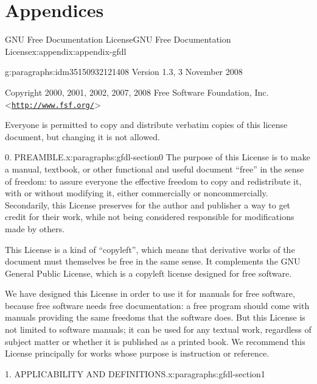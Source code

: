 \documentclass[twoside,10pt,]{tufte-book}
\numberwithin{equation}{part}
\begin{document}
\part*{Appendices}%
%
%
\typeout{************************************************}
\typeout{************************************************}
%
\begin{appendixptx}{GNU Free Documentation License}{}{GNU Free Documentation License}{}{}{x:appendix:appendix-gfdl}
\begin{paragraphs}{}{g:paragraphs:idm35150932121408}%
Version 1.3, 3 November 2008%
\par
Copyright \textcopyright{} 2000, 2001, 2002, 2007, 2008 Free Software Foundation, Inc. \textless{}\href{http://www.fsf.org/}{\nolinkurl{http://www.fsf.org/}}\textgreater{}%
\par
Everyone is permitted to copy and distribute verbatim copies of this license document, but changing it is not allowed.%
\end{paragraphs}%
\begin{paragraphs}{0. PREAMBLE.}{x:paragraphs:gfdl-section0}%
The purpose of this License is to make a manual, textbook, or other functional and useful document ``free'' in the sense of freedom: to assure everyone the effective freedom to copy and redistribute it, with or without modifying it, either commercially or noncommercially. Secondarily, this License preserves for the author and publisher a way to get credit for their work, while not being considered responsible for modifications made by others.%
\par
This License is a kind of ``copyleft'', which means that derivative works of the document must themselves be free in the same sense. It complements the GNU General Public License, which is a copyleft license designed for free software.%
\par
We have designed this License in order to use it for manuals for free software, because free software needs free documentation: a free program should come with manuals providing the same freedoms that the software does. But this License is not limited to software manuals; it can be used for any textual work, regardless of subject matter or whether it is published as a printed book. We recommend this License principally for works whose purpose is instruction or reference.%
\end{paragraphs}%
\begin{paragraphs}{1. APPLICABILITY AND DEFINITIONS.}{x:paragraphs:gfdl-section1}%

\end{paragraphs}
\end{appendixptx}
\end{document}

